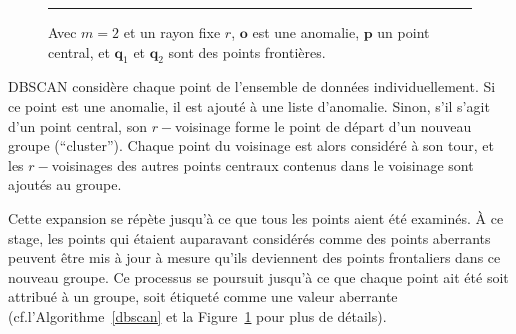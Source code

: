\begin{figure}[b]
\hrule \vspace{0.4cm}
\centering
{}
\caption{Avec $m=2$ et un rayon fixe $r$, $\mathbf{o}$ est une anomalie, $\mathbf{p}$ un point central, et $\mathbf{q}_1$ et $\mathbf{q}_2$ sont des points frontières.}
\label{DBSCANlabels}
\end{figure}
\noindent DBSCAN considère chaque point de l'ensemble de données individuellement. Si ce point est une anomalie, il est ajouté à une liste d'anomalie. Sinon, s'il s'agit d'un point central, son $r-$voisinage forme le point de d\'epart d'un nouveau groupe (``cluster''). Chaque point du voisinage est alors considéré à son tour, et les $r-$voisinages des autres points centraux contenus dans le voisinage sont ajoutés au groupe. \par Cette expansion se répète jusqu'à ce que tous les points aient été examinés. \`A ce stage, les points qui étaient auparavant considérés comme des points aberrants peuvent être mis à jour à mesure qu'ils deviennent des points frontaliers dans ce nouveau groupe. Ce processus se poursuit jusqu'à ce que chaque point ait été soit attribué à un groupe, soit étiqueté comme une valeur aberrante (cf.\@ l'Algorithme~\ref{dbscan} et la Figure~\ref{DBSCANlabels} pour plus de d\'etails).

